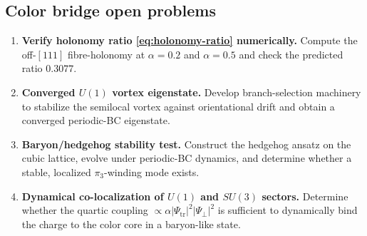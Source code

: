 \subsection{Color bridge open problems}
\label{subsec:color-open}

\begin{enumerate}
  \item \textbf{Verify holonomy ratio \eqref{eq:holonomy-ratio} numerically.}
  Compute the off-$[111]$ fibre-holonomy at $\alpha=0.2$ and $\alpha=0.5$ and check the predicted
  ratio $0.3077$.

  \item \textbf{Converged $U(1)$ vortex eigenstate.}
  Develop branch-selection machinery to stabilize the semilocal vortex against orientational drift
  and obtain a converged periodic-BC eigenstate.

  \item \textbf{Baryon/hedgehog stability test.}
  Construct the hedgehog ansatz on the cubic lattice, evolve under periodic-BC dynamics, and
  determine whether a stable, localized $\pi_3$-winding mode exists.

  \item \textbf{Dynamical co-localization of $U(1)$ and $SU(3)$ sectors.}
  Determine whether the quartic coupling $\propto\alpha|\Psi_{\mathrm{tr}}|^2|\Psi_\perp|^2$
  is sufficient to dynamically bind the charge to the color core in a baryon-like state.
\end{enumerate}